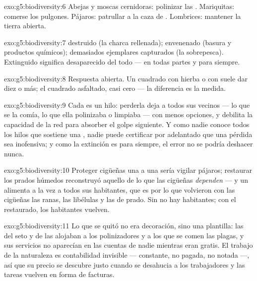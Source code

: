 \begin{solution}{exo:g5:biodiversity:6}
Abejas y moscas cernidoras: polinizar las . Mariquitas: comerse
los pulgones. Pájaros: patrullar a la caza de . Lombrices:
mantener la tierra abierta.
\end{solution}

\begin{solution}{exo:g5:biodiversity:7}
 destruido (la charca rellenada);  envenenado (basura y
productos químicos); demasiados ejemplares capturados (la sobrepesca).
Extinguido significa desaparecido del todo --- en todas partes y para
siempre.
\end{solution}

\begin{solution}{exo:g5:biodiversity:8}
Respuesta abierta. Un cuadrado con hierba o con  suele dar diez
 o más; el cuadrado asfaltado, casi cero --- la diferencia es
la medida.
\end{solution}

\begin{solution}{exo:g5:biodiversity:9}
Cada  es un hilo: perderla deja a todos sus vecinos --- lo que
se la comía, lo que ella polinizaba o limpiaba --- con menos opciones,
y debilita la capacidad de la red para absorber el golpe siguiente. Y
como nadie conoce todos los hilos que sostiene una , nadie
puede certificar por adelantado que una pérdida sea inofensiva; y como
la extinción es para siempre, el error no se podría deshacer nunca.
\end{solution}

\begin{solution}{exo:g5:biodiversity:10}
Proteger cigüeñas una a una sería vigilar pájaros; restaurar los
prados húmedos reconstruyó aquello de lo que las cigüeñas
\emph{dependen} --- y un  alimenta a la vez a todos sus
habitantes, que es por lo que volvieron con las cigüeñas las ranas,
las libélulas y las  de prado. Sin  no hay habitantes;
con el  restaurado, los habitantes vuelven.
\end{solution}

\begin{solution}{exo:g5:biodiversity:11}
Lo que se quitó no era decoración, sino una plantilla: las 
del seto y de las  alojaban a los polinizadores y a los que se
comen las plagas, y sus servicios no aparecían en las cuentas de nadie
mientras eran gratis. El trabajo de la naturaleza es contabilidad
invisible --- constante, no pagada, no notada ---, así que su precio
se descubre justo cuando se desahucia a los trabajadores y las tareas
vuelven en forma de facturas.
\end{solution}
